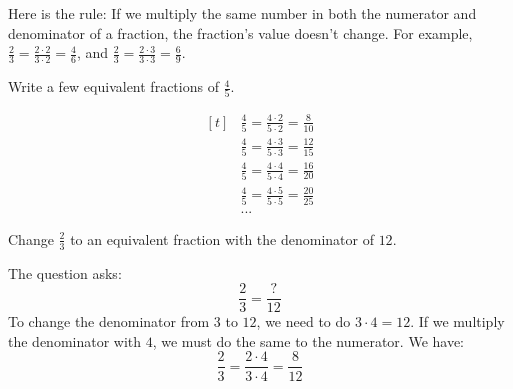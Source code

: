 \begin{center}
\end{center}

Here is the rule: If we multiply the same number in both the numerator and denominator of a fraction, the fraction's value doesn't change. For example, $\frac{2}{3}=\frac{2\cdot2}{3\cdot2}=\frac{4}{6}$, and $\frac{2}{3}=\frac{2\cdot3}{3\cdot3}=\frac{6}{9}$.

\begin{myexample}
Write a few equivalent fractions of $\frac{4}{5}$.
\end{myexample}
\begin{solution}
\[
\begin{aligned}[t]
   &\frac{4}{5}=\frac{4\cdot2}{5\cdot2}=\frac{8}{10} \\
   &\frac{4}{5}=\frac{4\cdot3}{5\cdot3}=\frac{12}{15} \\
   &\frac{4}{5}=\frac{4\cdot4}{5\cdot4}=\frac{16}{20} \\
   &\frac{4}{5}=\frac{4\cdot5}{5\cdot5}=\frac{20}{25} \\
   &...
\end{aligned}
\]
\end{solution}

\begin{myexample}
Change $\frac{2}{3}$ to an equivalent fraction with the denominator of $12$.
\end{myexample}
\begin{solution}
The question asks:
\[ \frac{2}{3}=\frac{?}{12} \]
To change the denominator from $3$ to $12$, we need to do $3\cdot4=12$. If we multiply the denominator with $4$, we must do the same to the numerator. We have:
\[ \frac{2}{3}=\frac{2\cdot4}{3\cdot4}=\frac{8}{12} \]
\end{solution}


